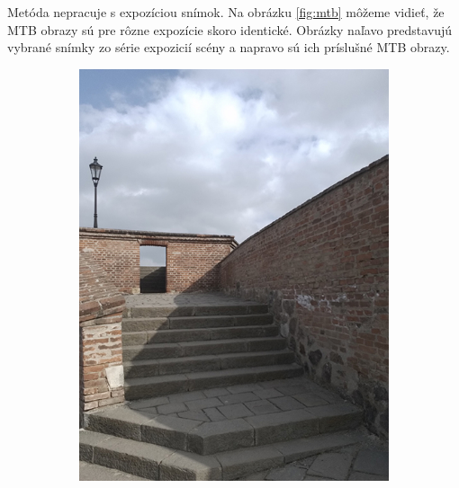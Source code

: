Metóda nepracuje s expozíciou snímok. Na obrázku \ref{fig:mtb} môžeme vidieť, že MTB obrazy sú pre rôzne expozície
skoro identické. Obrázky naľavo predstavujú vybrané snímky zo série expozicií scény a napravo sú ich príslušné
MTB obrazy.

\begin{figure}[t]
    \centering
    \begin{subfigure}{0.3\textwidth}
        \includegraphics[width=\textwidth]{figures/capturing/align/image1}
    \end{subfigure}
    ~
    \begin{subfigure}{0.3\textwidth}

\end{subfigure}
\end{figure}
